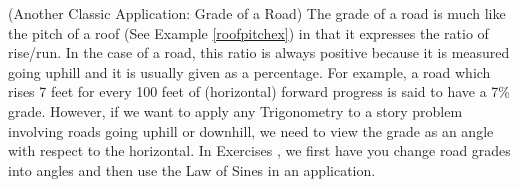 {\noindent {}
\label{gradeofroad}
(Another Classic Application:  Grade of a Road) The grade of a road is much like the pitch of a roof (See Example \ref{roofpitchex}) in that it expresses the ratio of rise/run.  In the case of a road, this ratio is always positive because it is measured going uphill and it is usually given as a percentage.  For example, a road which rises 7 feet for every 100 feet of (horizontal) forward progress is said to have a 7\% grade.  However, if we want to apply any Trigonometry to a story problem involving roads going uphill or downhill, we need to view the grade as an angle with respect to the horizontal.  In Exercises}
{, we first have you change road grades into angles and then use the Law of Sines in an application.}
